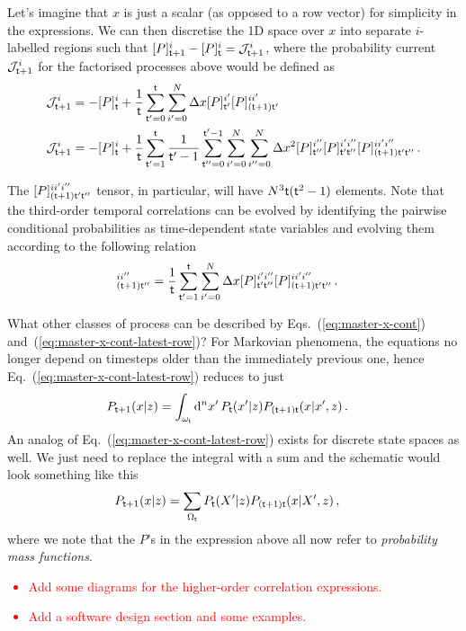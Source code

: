 Let's imagine that $x$ is just a scalar (as opposed to a row vector) for simplicity in the expressions. We can then discretise the 1D space over $x$ into separate $i$-labelled regions such that $[P]^i_{{\sf t}+1} - [P]^i_{{\sf t}} = {\cal J}^i_{{\sf t}+1}$, where the probability current ${\cal J}^i_{{\sf t}+1}$ for the factorised processes above would be defined as
\begin{align}
{\cal J}^i_{{\sf t}+1} &= - [P]^i_{{\sf t}} + \frac{1}{{\sf t}}\sum^{{\sf t}}_{{\sf t}'=0}\sum_{i'=0}^N\Delta x[P]^{i'}_{{\sf t}'}[P]^{ii'}_{({\sf t}+1){\sf t}'} \\
{\cal J}^i_{{\sf t}+1} &= - [P]^i_{{\sf t}} + \frac{1}{{\sf t}}\sum^{{\sf t}}_{{\sf t}'=1}\frac{1}{{\sf t}'-1}\sum^{{\sf t}'-1}_{{\sf t}''=0}\sum_{i'=0}^N\sum_{i''=0}^N\Delta x^2[P]^{i''}_{{\sf t}''}[P]^{i'i''}_{{\sf t}'{\sf t}''}[P]^{ii'i''}_{({\sf t}+1){\sf t}'{\sf t}''}\,.
\end{align}

The $[P]^{ii'i''}_{({\sf t}+1){\sf t}'{\sf t}''}$ tensor, in particular, will have $N^3{\sf t}({\sf t}^2-1)$ elements. Note that the third-order temporal correlations can be evolved by identifying the pairwise conditional probabilities as time-dependent state variables and evolving them according to the following relation
\begin{align}
[P]^{ii''}_{({\sf t}+1){\sf t}''} &= \frac{1}{{\sf t}}\sum^{{\sf t}}_{{\sf t}'=1}\sum_{i'=0}^N\Delta x[P]^{i'i''}_{{\sf t}'{\sf t}''}[P]^{ii'i''}_{({\sf t}+1){\sf t}'{\sf t}''}\,.
\end{align}

What other classes of process can be described by Eqs.~(\ref{eq:master-x-cont}) and~(\ref{eq:master-x-cont-latest-row})? For Markovian phenomena, the equations no longer depend on timesteps older than the immediately previous one, hence Eq.~(\ref{eq:master-x-cont-latest-row}) reduces to just
\begin{align}
P_{{\sf t}+1}(x\vert z) &= \int_{\omega_{\sf t}}{\rm d}^nx' \, P_{\sf t}(x'\vert z) P_{({\sf t}+1){\sf t}}(x\vert x',z) \label{eq:master-x-cont-markov} \,.
\end{align}
An analog of Eq.~(\ref{eq:master-x-cont-latest-row}) exists for discrete state spaces as well. We just need to replace the integral with a sum and the schematic would look something like this
\begin{align}
P_{{\sf t}+1}(x\vert z) &= \sum_{\Omega_{{\sf t}}} P_{{\sf t}}(X'\vert z) P_{({\sf t}+1){\sf t}}(x \vert X', z) \label{eq:master-x-disc} \,,
\end{align}
where we note that the $P$'s in the expression above all now refer to \emph{probability mass functions}.

\textcolor{red}{
\begin{itemize}
\item{Add some diagrams for the higher-order correlation expressions.}
\item{Add a software design section and some examples.} 
\end{itemize}
}

    